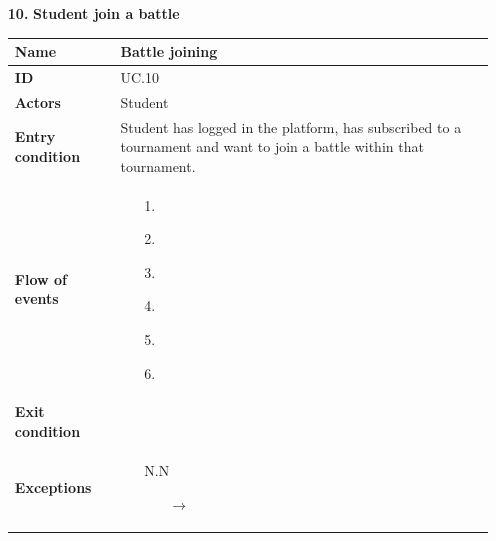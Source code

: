 \documentclass{article}
\begin{document}
{\begin{enumerate}
                    \item[\textbf{10.}] \textbf{Student join a battle}
                    \begin{xltabular}{\textwidth}
                        {| >{\raggedright\arraybackslash}g | >{\raggedright\arraybackslash}X |}      
                        \hline
                        \endfirsthead
                        \hline
                        \endhead
                        \endfoot
                        \hline
                        \endlastfoot
                        

                        
                        
                        \textbf{Name} & Battle joining\\
                        \hline
                        \textbf{ID} & UC.10\\
                        \hline
                        \textbf{Actors} & Student\\
                        \hline
                        \textbf{Entry condition} & Student has logged in the platform, has subscribed to a 
                        tournament and want to join a battle within that tournament.\\
                        \hline
                        \textbf{Flow of events} &    \begin{enumerate}
                                                        \item[1.] 
                                                        \item[2.] 
                                                        \item[3.] 
                                                        \item[4.] 
                                                        \item[5.] 
                                                        \item[6.] 
                                                    \end{enumerate} \\
                        \hline
                        \textbf{Exit condition} & \\
                        \hline
                        \textbf{Exceptions} &    \begin{itemize}
                                                    \item[N.N] 
                                                    \begin{itemize}
                                                        \item[$\rightarrow$] 
                                                    \end{itemize} 
                                                \end{itemize}
                    \end{xltabular}
                    

\end{enumerate}}
\end{document}
